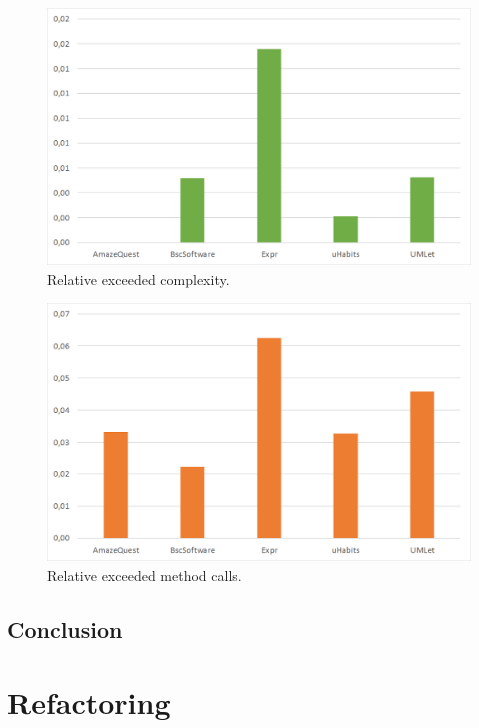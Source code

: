 \documentclass[conference]{IEEEtran}
\begin{document}
\begin{figure}
	\includegraphics[width=\columnwidth]{img/rel_exceeded_complexity.png}
\caption{Relative exceeded complexity.}
\label{fig:exceed_complexity}
\end{figure}

\begin{figure}
	\includegraphics[width=\columnwidth]{img/rel_exceeded_calls.png}
\caption{Relative exceeded method calls.}
\label{fig:exceed_calls}
\end{figure}

\subsection{Conclusion}

\section{Refactoring}
\end{document}
